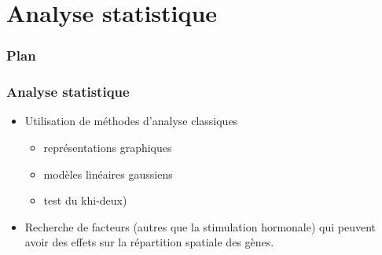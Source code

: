 \documentclass{beamer}
\begin{document}
{\begin{center}
      \end{center} 
    }
    
%    
    
%    
    
\section{Analyse statistique}
  
  \frame
  {
    \frametitle{Plan}
  }
  
  \frame
  {
    \frametitle{Analyse statistique}
    \begin{itemize}
      
      \item Utilisation de méthodes d'analyse classiques
        \begin{itemize}
          \item représentations graphiques
          \item modèles linéaires gaussiens
          \item test du khi-deux)
        \end{itemize}
      \item Recherche de facteurs (autres que la stimulation hormonale) qui peuvent avoir des effets sur la répartition spatiale des gènes.
    \end{itemize}
  }
  
\end{document}
